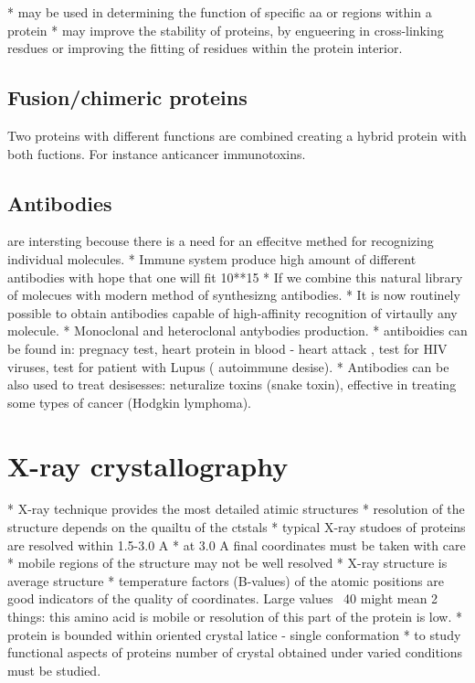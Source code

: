 \documentclass{article}
\begin{document}
* may be used in determining the function of specific aa or regions within a protein
* may improve the stability of proteins, by engueering in cross-linking resdues or improving the fitting of
residues within the protein interior.

\subsection{Fusion/chimeric proteins}
Two proteins with different functions are combined creating a hybrid protein with both fuctions. For instance
anticancer immunotoxins.
\subsection{Antibodies} are intersting becouse there is a need for an effecitve methed for recognizing individual
molecules.
* Immune system produce high amount of different antibodies with hope that one will fit 10**15
* If we combine this natural library of molecues with modern method of synthesizng antibodies.
* It is now routinely possible to obtain antibodies capable of high-affinity recognition of virtaully any
molecule.
* Monoclonal and heteroclonal antybodies production.
* antiboidies can be found in: pregnacy test, heart protein in blood - heart attack , test for HIV viruses,
test for patient with Lupus ( autoimmune desise).
* Antibodies can be also used to treat desisesses: neturalize toxins (snake toxin), effective in treating some
types of cancer (Hodgkin lymphoma).

\section{X-ray crystallography}
* X-ray technique provides the most detailed atimic structures
* resolution of the structure depends on the quailtu of the ctstals
* typical X-ray studoes of proteins are resolved within 1.5-3.0 A
* at 3.0 A final coordinates must be taken with care
* mobile regions of the structure may not be well resolved
* X-ray structure is average structure
* temperature factors (B-values) of the atomic positions are good indicators of the quality of coordinates.
Large values ~40 might mean 2 things: this amino acid is mobile or resolution of this part of the protein is
low.
* protein is bounded within oriented crystal latice - single conformation
* to study functional aspects of proteins number of crystal obtained under varied conditions must be studied.
\end{document}
